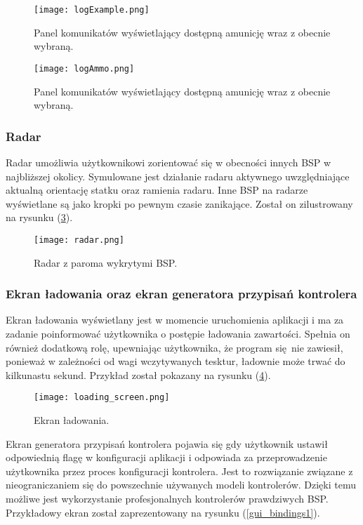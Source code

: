 \begin{figure}
	\centering
	\texttt{[image: logExample.png]}
	\caption{Panel komunikatów wyświetlający dostępną amunicję wraz z obecnie wybraną.}
	\label{logExample}
\end{figure}

\begin{figure}
	\centering
	\texttt{[image: logAmmo.png]}
	\caption{Panel komunikatów wyświetlający dostępną amunicję wraz z obecnie wybraną.}
	\label{logAmmo}
\end{figure}


\subsubsection{Radar}

Radar umożliwia użytkownikowi zorientować się w obecności innych BSP w najbliższej okolicy. Symulowane jest działanie radaru aktywnego uwzględniające aktualną orientację statku oraz ramienia radaru. Inne BSP na radarze wyświetlane są jako kropki po pewnym czasie zanikające. Został on zilustrowany na rysunku (\ref{radar}).


\begin{figure}[h]
	\centering
	\texttt{[image: radar.png]}
	\caption{Radar z paroma wykrytymi BSP.}
	\label{radar}
\end{figure}

\subsubsection{Ekran ładowania oraz ekran generatora przypisań kontrolera}
	
Ekran ładowania wyświetlany jest w momencie uruchomienia aplikacji i ma za zadanie poinformować użytkownika o postępie ładowania zawartości. Spełnia on również dodatkową rolę, upewniając użytkownika, że program się nie zawiesił, ponieważ w zależności od wagi wczytywanych tesktur, ładownie może trwać do kilkunastu sekund. Przykład został pokazany na rysunku (\ref{gui_loading}).

\begin{figure}[!h]
	\centering
	\texttt{[image: loading\_screen.png]}
	\caption{Ekran ładowania.}
	\label{gui_loading}
\end{figure}

Ekran generatora przypisań kontrolera pojawia się gdy użytkownik ustawił odpowiednią flagę w konfiguracji aplikacji i odpowiada za przeprowadzenie użytkownika przez proces konfiguracji kontrolera. Jest to rozwiązanie związane z nieograniczaniem się do powszechnie używanych modeli kontrolerów. Dzięki temu możliwe jest wykorzystanie profesjonalnych kontrolerów prawdziwych BSP. Przykładowy ekran został zaprezentowany na rysunku (\ref{gui_bindings1}).

